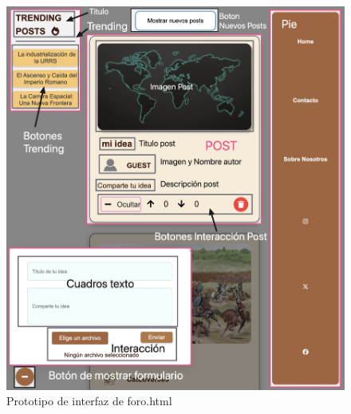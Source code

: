 \documentclass{article}
\begin{document}
\begin{figure}[H]
\begin{minipage}{0.49\textwidth}
        \includegraphics[width=\linewidth]{htmlFotos/prototipoForo.jpg}
        \caption{Prototipo de interfaz de foro.html}
        \label{fig:prototipo_foro}
    \end{minipage}
\end{figure}

\vspace{10mm}
\end{document}
